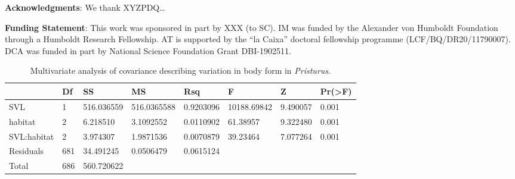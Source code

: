 \documentclass[
  11pt,
]{article}
\begin{document}
\textbf{Acknowledgments}: We thank XYZPDQ\ldots{}

\textbf{Funding Statement}: This work was sponsored in part by XXX (to
SC). IM was funded by the Alexander von Humboldt Foundation through a
Humboldt Research Fellowship. AT is supported by the ``la Caixa''
doctoral fellowship programme (LCF/BQ/DR20/11790007). DCA was funded in
part by National Science Foundation Grant DBI-1902511.

\newpage

\begin{table}[H]

\caption{\label{tab:unnamed-chunk-1}Multivariate analysis of covariance describing variation in body form in \textit{Pristurus}.}
\centering
\begin{tabular}[t]{llllllll}
\toprule
  & Df & SS & MS & Rsq & F & Z & Pr(>F)\\
\midrule
SVL & 1 & 516.036559 & 516.0365588 & 0.9203096 & 10188.69842 & 9.490057 & 0.001\\
habitat & 2 & 6.218510 & 3.1092552 & 0.0110902 & 61.38957 & 9.322480 & 0.001\\
SVL:habitat & 2 & 3.974307 & 1.9871536 & 0.0070879 & 39.23464 & 7.077264 & 0.001\\
Residuals & 681 & 34.491245 & 0.0506479 & 0.0615124 &  &  & \\
Total & 686 & 560.720622 &  &  &  &  & \\
\bottomrule
\end{tabular}
\end{table}

\newpage
\end{document}
